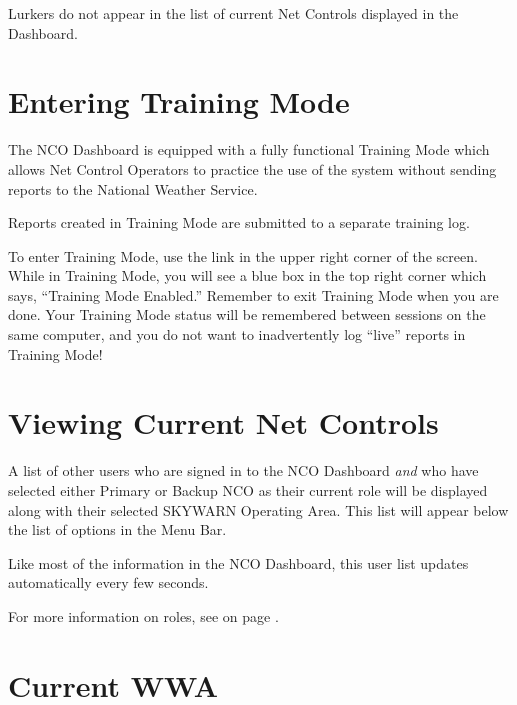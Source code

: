 \documentclass[pdflatex,letterpaper,twoside,12pt]{book}
\begin{document}
Lurkers do not appear in the list of current Net Controls displayed in the Dashboard.


\section{Entering Training Mode}\label{enter-training-mode}

The NCO Dashboard is equipped with a fully functional Training Mode which allows Net Control Operators to practice the use of the system without sending reports to the National Weather Service.

Reports created in Training Mode are submitted to a separate training log.

To enter Training Mode, use the link in the upper right corner of the screen.  While in Training Mode, you will see a blue box in the top right corner which says, ``Training Mode Enabled.''  Remember to exit Training Mode when you are done.  Your Training Mode status will be remembered between sessions on the same computer, and you do not want to inadvertently log ``live'' reports in Training Mode!


\section{Viewing Current Net Controls}\label{dash-view-users}

A list of other users who are signed in to the NCO Dashboard \emph{and} who have selected either Primary or Backup NCO as their current role will be displayed along with their selected SKYWARN Operating Area.  This list will appear below the list of options in the Menu Bar.

Like most of the information in the NCO Dashboard, this user list updates automatically every few seconds.

For more information on roles, see  on page \pageref{dash-set-role}.


\section{Current WWA}\label{dash-current-wwa}
\end{document}
